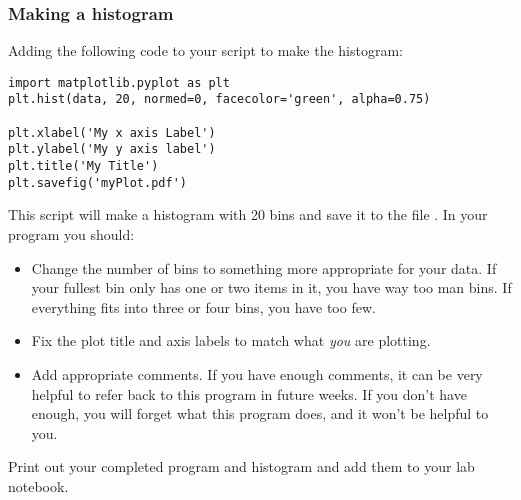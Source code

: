\documentclass[twoside,11pt,ShortChapTitles]{BYUTextbook}
\begin{document}
\subsubsection{Making a histogram}

Adding the following code to your script to make the histogram:

\begin{lstlisting}
import matplotlib.pyplot as plt
plt.hist(data, 20, normed=0, facecolor='green', alpha=0.75)

plt.xlabel('My x axis Label')
plt.ylabel('My y axis label')
plt.title('My Title')
plt.savefig('myPlot.pdf')

\end{lstlisting}

This script will make a histogram with 20 bins and save it to the file .  In your program you should:
\begin{itemize}
\item Change the number of bins to something more appropriate for your data. If your fullest bin only has one or two items in it, you have way too man bins.  If everything fits into three or four bins, you have too few.
\item Fix the plot title and axis labels to match what {\em you} are plotting.
\item Add appropriate comments. If you have enough comments, it can be very helpful to refer back to this program in future weeks.  If you don't have enough, you will forget what this program does, and it won't be helpful to you.
\end{itemize}

Print out your completed program and histogram and add them to your lab notebook.
\end{document}
